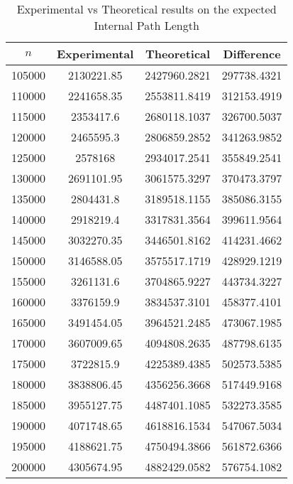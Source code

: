 \begin{table}
\begin{minipage}{0.42\textwidth}
\begin{tabular}{|c|c|c|c|}
            \hline 
            $n$ & Experimental & Theoretical & Difference \\ 
            \hline 
            105000 & 2130221.85 & 2427960.2821 & 297738.4321 \\ 
            110000 & 2241658.35 & 2553811.8419 & 312153.4919 \\ 
            115000 & 2353417.6 & 2680118.1037 & 326700.5037 \\ 
            120000 & 2465595.3 & 2806859.2852 & 341263.9852 \\ 
            125000 & 2578168 & 2934017.2541 & 355849.2541 \\ 
            130000 & 2691101.95 & 3061575.3297 & 370473.3797 \\ 
            135000 & 2804431.8 & 3189518.1155 & 385086.3155 \\ 
            140000 & 2918219.4 & 3317831.3564 & 399611.9564 \\ 
            145000 & 3032270.35 & 3446501.8162 & 414231.4662 \\ 
            150000 & 3146588.05 & 3575517.1719 & 428929.1219 \\ 
            155000 & 3261131.6 & 3704865.9227 & 443734.3227 \\ 
            160000 & 3376159.9 & 3834537.3101 & 458377.4101 \\ 
            165000 & 3491454.05 & 3964521.2485 & 473067.1985 \\ 
            170000 & 3607009.65 & 4094808.2635 & 487798.6135 \\ 
            175000 & 3722815.9 & 4225389.4385 & 502573.5385 \\ 
            180000 & 3838806.45 & 4356256.3668 & 517449.9168 \\ 
            185000 & 3955127.75 & 4487401.1085 & 532273.3585 \\ 
            190000 & 4071748.65 & 4618816.1534 & 547067.5034 \\ 
            195000 & 4188621.75 & 4750494.3866 & 561872.6366 \\ 
            200000 & 4305674.95 & 4882429.0582 & 576754.1082 \\ 
            \hline 
        \end{tabular}
    \end{minipage}
    \caption{Experimental vs Theoretical results on the expected Internal Path Length}
    \label{tab:tabIPL}
\end{table}

